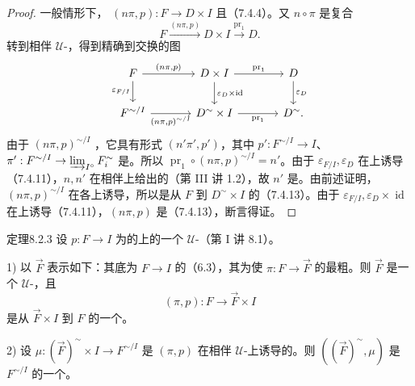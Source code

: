 \begin{proof}
一般情形下， $(n\pi,p):F\to D\times I$ 且（7.4.4）。又 $n\circ\pi$ 是复合
\[F\xrightarrow{(n\pi,p)}D\times I\xrightarrow{\operatorname{pr}_1}D.\]
转到相伴 $\mathcal U$-，得到精确到交换的图
\[\begin{tikzcd}[column sep=large]
F\arrow[r,"{(n\pi,p)}"]\arrow[d,"\varepsilon_{F/I}"']&D\times I\arrow[r,"\operatorname{pr}_1"]\arrow[d,"\varepsilon_D\times\operatorname{id}"]&D\arrow[d,"\varepsilon_D"]\\
F^{\sim/I}\arrow[r,"{(n\pi,p)^{\sim/I}}"']&D^\sim\times I\arrow[r,"\operatorname{pr}_1"']&D^\sim.
\end{tikzcd}\]
由于 $(n\pi,p)^{\sim/I}$ ，它具有形式 $(n'\pi',p')$，其中 $p':F^{\sim/I}\to I$、$\pi':F^{\sim/I}\to\varinjlim_{I^\circ}F_i^\sim$ 是。所以 $\operatorname{pr}_1\circ(n\pi,p)^{\sim/I}=n'$。由于 $\varepsilon_{F/I},\varepsilon_D$ 在上诱导（7.4.11），$n,n'$ 在相伴上给出的（第 III 讲 1.2），故 $n'$ 是。由前述证明，$(n\pi,p)^{\sim/I}$ 在各上诱导，所以是从 $F$ 到 $D^\sim\times I$ 的（7.4.13）。由于 $\varepsilon_{F/I},\varepsilon_D\times\operatorname{id}$ 在上诱导（7.4.11），$(n\pi,p)$ 是（7.4.13），断言得证。
\end{proof}
\begin{SGAresult}{定理}{8.2.3}
设 $p:F\to I$ 为的上的一个 $\mathcal U$-（第 I 讲 8.1）。

1) 以 $\overrightarrow F$ 表示如下：其底为 $F\to I$ 的（6.3），其为使 $\pi:F\to\overrightarrow F$ 的最粗。则 $\overrightarrow F$ 是一个 $\mathcal U$-，且
\[(\pi,p):F\longrightarrow\overrightarrow F\times I\]
是从 $\overrightarrow F\times I$ 到 $F$ 的一个。

2) 设 $\mu:(\overrightarrow F)^\sim\times I\to F^{\sim/I}$ 是 $(\pi,p)$ 在相伴 $\mathcal U$-上诱导的。则 $((\overrightarrow F)^\sim,\mu)$ 是 $F^{\sim/I}$ 的一个。
\end{SGAresult}
